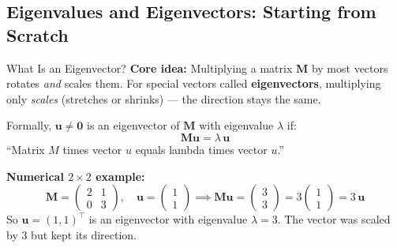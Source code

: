 \subsection{Eigenvalues and Eigenvectors: Starting from Scratch}

\begin{mathbox}{What Is an Eigenvector?}
\textbf{Core idea:} Multiplying a matrix $\mathbf{M}$ by most vectors rotates \emph{and} scales them. For special vectors called \textbf{eigenvectors}, multiplying only \emph{scales} (stretches or shrinks) --- the direction stays the same.

Formally, $\mathbf{u} \neq \mathbf{0}$ is an eigenvector of $\mathbf{M}$ with eigenvalue $\lambda$ if:
\[
\mathbf{M}\mathbf{u} = \lambda\, \mathbf{u}
\]
``Matrix $M$ times vector $u$ equals lambda times vector $u$.''

\textbf{Numerical $2\times 2$ example:}
\[
\mathbf{M} = \begin{pmatrix} 2 & 1 \\ 0 & 3 \end{pmatrix}, \quad \mathbf{u} = \begin{pmatrix} 1 \\ 1 \end{pmatrix}
\implies
\mathbf{M}\mathbf{u} = \begin{pmatrix} 3 \\ 3 \end{pmatrix} = 3 \begin{pmatrix} 1 \\ 1 \end{pmatrix} = 3\,\mathbf{u}
\]
So $\mathbf{u} = (1,1)^\top$ is an eigenvector with eigenvalue $\lambda = 3$. The vector was scaled by 3 but kept its direction.
\end{mathbox}

